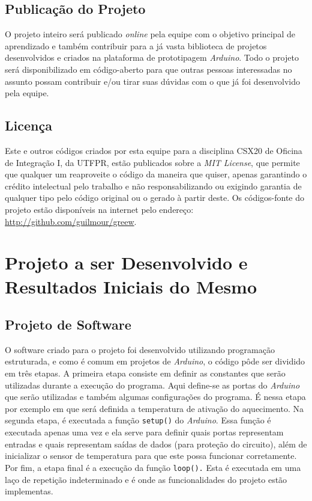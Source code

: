 \documentclass[a4paper,12pt]{article}
\begin{document}
\subsection{Publicação do Projeto}

O projeto inteiro será publicado \textit{online} pela equipe com o objetivo principal de aprendizado e também contribuir para a já vasta biblioteca de projetos desenvolvidos e criados na plataforma de prototipagem \textit{Arduino}. Todo o projeto será disponibilizado em código-aberto para que outras pessoas interessadas no assunto possam contribuir e/ou tirar suas dúvidas com o que já foi desenvolvido pela equipe.

\subsection{Licença}

Este e outros códigos criados por esta equipe para a disciplina CSX20 de Oficina de Integração I, da UTFPR, estão publicados sobre a \textit{MIT License}, que permite que qualquer um reaproveite o código da maneira que quiser, apenas garantindo o crédito intelectual pelo trabalho e não responsabilizando ou exigindo garantia de qualquer tipo pelo código original ou o gerado à partir deste. Os códigos-fonte do projeto estão disponíveis na internet pelo endereço: \href{http://github.com/guilmour/greew}{http://github.com/guilmour/greew}.


\newpage

\section{Projeto a ser Desenvolvido e Resultados Iniciais do Mesmo}

\subsection{Projeto de Software}

O software criado  para o projeto foi desenvolvido utilizando programação estruturada, e como é comum em projetos de \textit{Arduino}, o código pôde ser dividido em três etapas. A primeira etapa consiste em definir as constantes que serão utilizadas durante a execução do programa. Aqui define-se as portas do \textit{Arduino} que serão utilizadas e também algumas configurações do programa. É nessa etapa por exemplo em que será definida a temperatura de ativação do aquecimento. Na segunda etapa, é executada a função \texttt{setup()} do \textit{Arduino}. Essa função é executada apenas uma vez e ela serve para definir quais portas representam entradas e quais representam saídas de dados (para proteção do circuito), além de inicializar o sensor de temperatura para que este possa funcionar corretamente. Por fim, a etapa final é a execução da função \texttt{loop().} Esta é executada em uma laço de repetição indeterminado e é onde as funcionalidades do projeto estão implementas.
\end{document}
